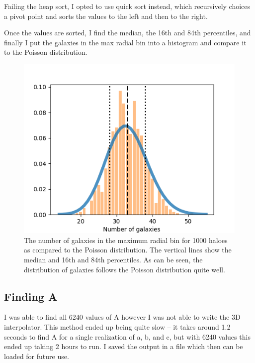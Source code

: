     Failing the heap sort, I opted to use quick sort instead, which recursively choices a pivot point and sorts the values to the left and then to the right.

    Once the values are sorted, I find the median, the 16th and 84th percentiles, and finally I put the galaxies in the max radial bin into a histogram and compare it to the Poisson distribution.

    


    

    

    \begin{figure}[H]
        \centering
        \includegraphics[width=.5\textwidth]{output/2g_ngal.png}
        \caption{The number of galaxies in the maximum radial bin for 1000 haloes as compared to the Poisson distribution. The vertical lines show the median and 16th and 84th percentiles. As can be seen, the distribution of galaxies follows the Poisson distribution quite well.}
    \end{figure}



    \newpage
    \subsection{Finding A}

    I was able to find all 6240 values of A however I was not able to write the 3D interpolator. This method ended up being quite slow -- it takes around 1.2 seconds to find A for a single realization of a, b, and c, but with 6240 values this ended up taking 2 hours to run. I saved the output in a file which then can be loaded for future use.

    
